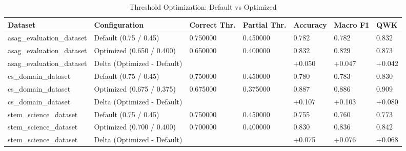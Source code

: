\begin{table}[h]
\centering
\caption{Threshold Optimization: Default vs Optimized}
\label{tab:threshold_opt}
\begin{tabular}{lllllll}
\toprule
Dataset & Configuration & Correct Thr. & Partial Thr. & Accuracy & Macro F1 & QWK \\
\midrule
asag\_evaluation\_dataset & Default (0.75 / 0.45) & 0.750000 & 0.450000 & 0.782 & 0.782 & 0.832 \\
asag\_evaluation\_dataset & Optimized (0.650 / 0.400) & 0.650000 & 0.400000 & 0.832 & 0.829 & 0.873 \\
asag\_evaluation\_dataset & Delta (Optimized - Default) &  &  & +0.050 & +0.047 & +0.042 \\
cs\_domain\_dataset & Default (0.75 / 0.45) & 0.750000 & 0.450000 & 0.780 & 0.783 & 0.830 \\
cs\_domain\_dataset & Optimized (0.675 / 0.375) & 0.675000 & 0.375000 & 0.887 & 0.886 & 0.909 \\
cs\_domain\_dataset & Delta (Optimized - Default) &  &  & +0.107 & +0.103 & +0.080 \\
stem\_science\_dataset & Default (0.75 / 0.45) & 0.750000 & 0.450000 & 0.755 & 0.760 & 0.773 \\
stem\_science\_dataset & Optimized (0.700 / 0.400) & 0.700000 & 0.400000 & 0.830 & 0.836 & 0.842 \\
stem\_science\_dataset & Delta (Optimized - Default) &  &  & +0.075 & +0.076 & +0.068 \\
\bottomrule
\end{tabular}
\end{table}
